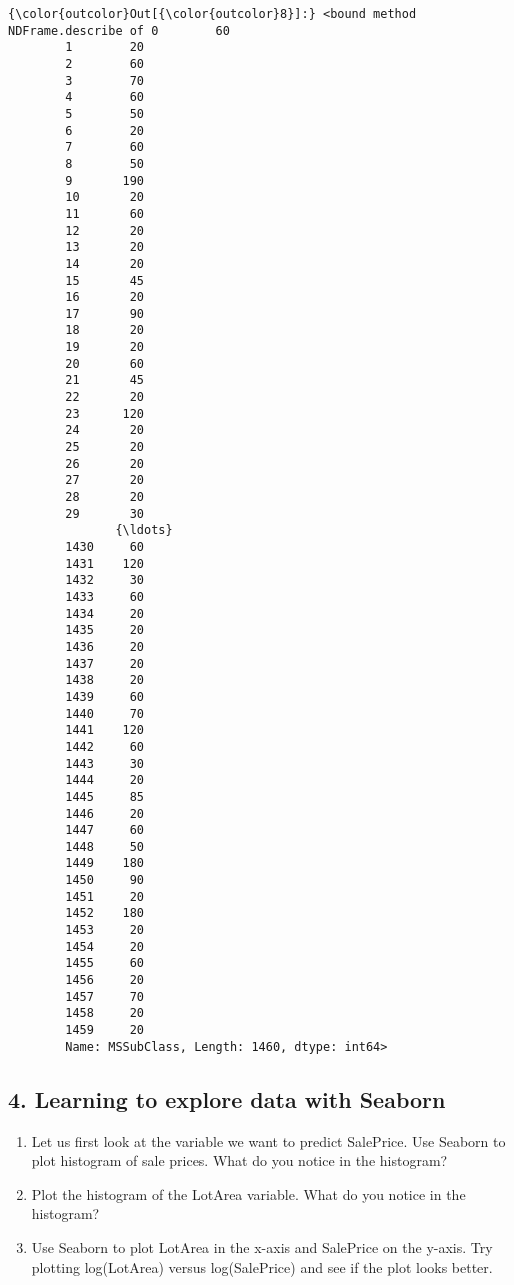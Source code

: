 \documentclass[11pt]{article}
\providecommand{\tightlist}{%
      \setlength{\itemsep}{0pt}\setlength{\parskip}{0pt}}
\begin{document}
\begin{Verbatim}[commandchars=\\\{\}]
{\color{outcolor}Out[{\color{outcolor}8}]:} <bound method NDFrame.describe of 0        60
        1        20
        2        60
        3        70
        4        60
        5        50
        6        20
        7        60
        8        50
        9       190
        10       20
        11       60
        12       20
        13       20
        14       20
        15       45
        16       20
        17       90
        18       20
        19       20
        20       60
        21       45
        22       20
        23      120
        24       20
        25       20
        26       20
        27       20
        28       20
        29       30
               {\ldots} 
        1430     60
        1431    120
        1432     30
        1433     60
        1434     20
        1435     20
        1436     20
        1437     20
        1438     20
        1439     60
        1440     70
        1441    120
        1442     60
        1443     30
        1444     20
        1445     85
        1446     20
        1447     60
        1448     50
        1449    180
        1450     90
        1451     20
        1452    180
        1453     20
        1454     20
        1455     60
        1456     20
        1457     70
        1458     20
        1459     20
        Name: MSSubClass, Length: 1460, dtype: int64>
\end{Verbatim}
            
    \subsection{4. Learning to explore data with
Seaborn}\label{learning-to-explore-data-with-seaborn}

\begin{enumerate}
\def\labelenumi{\arabic{enumi}.}
\tightlist
\item
  Let us first look at the variable we want to predict SalePrice. Use
  Seaborn to plot histogram of sale prices. What do you notice in the
  histogram?
\item
  Plot the histogram of the LotArea variable. What do you notice in the
  histogram?
\item
  Use Seaborn to plot LotArea in the x-axis and SalePrice on the y-axis.
  Try plotting log(LotArea) versus log(SalePrice) and see if the plot
  looks better.
\end{enumerate}
\end{document}
